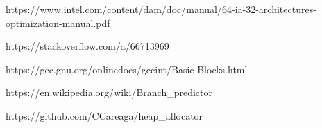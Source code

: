 \documentclass[12pt,a4paper]{report}
\begin{document}
\begin{thebibliography}{}
https://www.intel.com/content/dam/doc/manual/64-ia-32-architectures-optimization-manual.pdf

https://stackoverflow.com/a/66713969

https://gcc.gnu.org/onlinedocs/gccint/Basic-Blocks.html

https://en.wikipedia.org/wiki/Branch\_predictor

https://github.com/CCareaga/heap\_allocator
\end{thebibliography}
\end{document}
